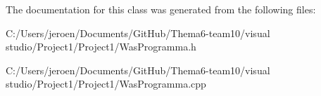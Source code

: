 The documentation for this class was generated from the following files\+:\begin{DoxyCompactItemize}
\item 
C\+:/\+Users/jeroen/\+Documents/\+Git\+Hub/\+Thema6-\/team10/visual studio/\+Project1/\+Project1/Was\+Programma.\+h\item 
C\+:/\+Users/jeroen/\+Documents/\+Git\+Hub/\+Thema6-\/team10/visual studio/\+Project1/\+Project1/Was\+Programma.\+cpp\end{DoxyCompactItemize}
